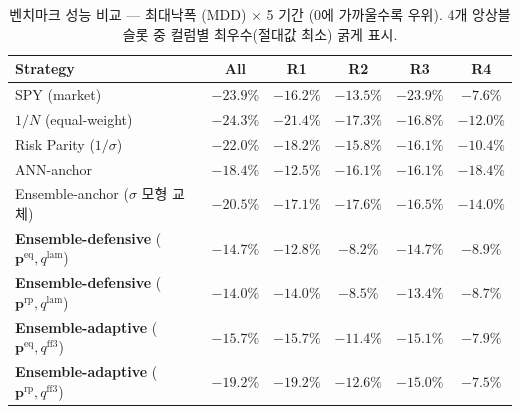 \documentclass{article}
\begin{document}
\begin{table}[ht]
\centering
\caption{벤치마크 성능 비교 — 최대낙폭 (MDD) $\times$ 5 기간 (0에 가까울수록 우위).
4개 앙상블 슬롯 중 컬럼별 최우수(절대값 최소) 굵게 표시.}
\label{tab:benchmark_mdd}
\setlength{\tabcolsep}{6pt}
\renewcommand{\arraystretch}{1.15}
\small
\begin{tabular}{lccccc}
\toprule
Strategy & All & R1 & R2 & R3 & R4 \\
\midrule
SPY (market)                       & $-23.9\%$ & $-16.2\%$ & $-13.5\%$ & $-23.9\%$ & $-7.6\%$  \\
$1/N$ (equal-weight)               & $-24.3\%$ & $-21.4\%$ & $-17.3\%$ & $-16.8\%$ & $-12.0\%$ \\
Risk Parity ($1/\sigma$)           & $-22.0\%$ & $-18.2\%$ & $-15.8\%$ & $-16.1\%$ & $-10.4\%$ \\
ANN-anchor \citep{pyo2018}         & $-18.4\%$ & $-12.5\%$ & $-16.1\%$ & $-16.1\%$ & $-18.4\%$ \\
Ensemble-anchor ($\sigma$ 모형 교체) & $-20.5\%$ & $-17.1\%$ & $-17.6\%$ & $-16.5\%$ & $-14.0\%$ \\
\midrule
\textbf{Ensemble-defensive} ($\mathbf{p}^{\mathrm{eq}}, q^{\mathrm{lam}}$) & $-14.7\%$          & $\mathbf{-12.8\%}$ & $\mathbf{-8.2\%}$ & $-14.7\%$          & $-8.9\%$ \\
\textbf{Ensemble-defensive} ($\mathbf{p}^{\mathrm{rp}}, q^{\mathrm{lam}}$) & $\mathbf{-14.0\%}$ & $-14.0\%$          & $-8.5\%$          & $\mathbf{-13.4\%}$ & $-8.7\%$ \\
\textbf{Ensemble-adaptive}  ($\mathbf{p}^{\mathrm{eq}}, q^{\mathrm{ff3}}$) & $-15.7\%$          & $-15.7\%$          & $-11.4\%$         & $-15.1\%$          & $-7.9\%$ \\
\textbf{Ensemble-adaptive}  ($\mathbf{p}^{\mathrm{rp}}, q^{\mathrm{ff3}}$) & $-19.2\%$          & $-19.2\%$          & $-12.6\%$         & $-15.0\%$          & $\mathbf{-7.5\%}$ \\
\bottomrule
\end{tabular}
\end{table}
\end{document}
